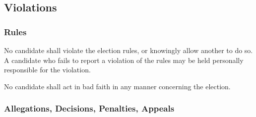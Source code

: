 \subsection{Violations}
\subsubsection{Rules}
No candidate shall violate the election rules, or knowingly allow another to do so.
A candidate who fails to report a violation of the rules may be held personally responsible for the violation.

No candidate shall act in bad faith in any manner concerning the election.
\subsubsection{Allegations, Decisions, Penalties, Appeals}

